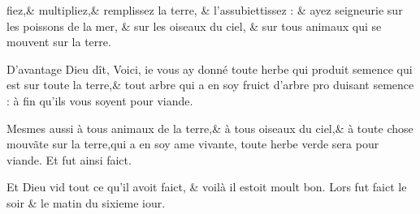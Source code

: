 \vfill\break
\noindent fiez,\& multipliez,\& remplissez la terre,
\& l'assubiettissez : \& \footnotemarkmain{}ayez seigneurie
sur les poissons de la mer, \& sur les oi\-seaux
du ciel, \& sur tous animaux qui se mouvent sur la terre.

\bverse D'avantage Dieu dît, Voici, ie vous
ay donné toute herbe qui produit se\-mence
qui est sur toute la terre,\& tout
arbre qui a en soy fruict d'arbre pro\-
duisant semence : \footnotemarkverse{}à fin qu'ils vous
soyent pour viande.

\bverse Mesmes aussi à tous animaux de la
terre,\& à tous oiseaux du ciel,\& à tou\-te
chose mouv\~ate sur la terre,qui a en
soy ame vivante, toute herbe verde se\-ra
pour viande. Et fut ainsi faict.

\bverse \footnotemarkmain{} \footnotemarkverse{}Et Dieu vid
tout ce qu'il avoit faict, \& voilà il estoit moult bon. Lors
fut faict le soir \& le matin du sixieme
iour.

